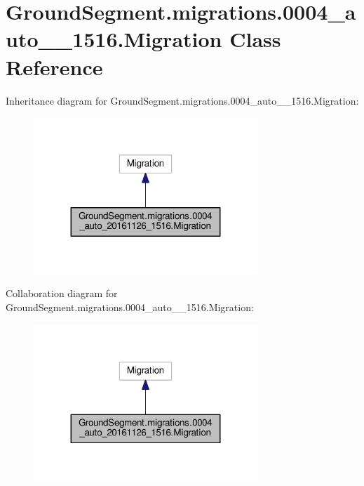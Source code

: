 \hypertarget{class_ground_segment_1_1migrations_1_10004__auto__20161126__1516_1_1_migration}{}\section{Ground\+Segment.\+migrations.0004\+\_\+auto\+\_\+\_\+1516.Migration Class Reference}
\label{class_ground_segment_1_1migrations_1_10004__auto__20161126__1516_1_1_migration}


Inheritance diagram for Ground\+Segment.\+migrations.0004\+\_\+auto\+\_\+\_\+1516.Migration\+:\nopagebreak
\begin{figure}[H]
\begin{center}
\leavevmode
\includegraphics[width=239pt]{class_ground_segment_1_1migrations_1_10004__auto__20161126__1516_1_1_migration__inherit__graph}
\end{center}
\end{figure}


Collaboration diagram for Ground\+Segment.\+migrations.0004\+\_\+auto\+\_\+\_\+1516.Migration\+:\nopagebreak
\begin{figure}[H]
\begin{center}
\leavevmode
\includegraphics[width=239pt]{class_ground_segment_1_1migrations_1_10004__auto__20161126__1516_1_1_migration__coll__graph}
\end{center}
\end{figure}
